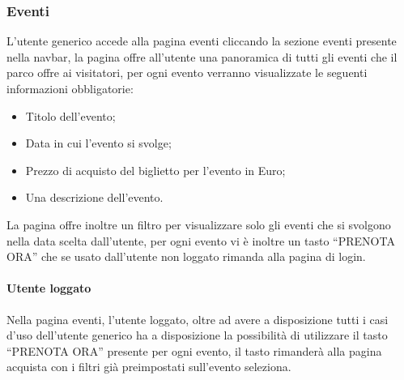         \subsubsection{Eventi}
            L’utente generico accede alla pagina eventi cliccando la sezione eventi presente nella navbar, la pagina offre all’utente una panoramica di tutti gli eventi che il parco offre ai visitatori, per ogni evento verranno visualizzate le seguenti informazioni obbligatorie:
            \begin{itemize}
                \item Titolo dell’evento;
                \item Data in cui l’evento si svolge;
                \item Prezzo di acquisto del biglietto per l’evento in Euro;
                \item Una descrizione dell’evento.
            \end{itemize}
            La pagina offre inoltre un filtro per visualizzare solo gli eventi che si svolgono nella data scelta dall’utente, per ogni evento vi è inoltre un tasto “PRENOTA ORA” che se usato dall’utente non loggato rimanda alla pagina di login.
            \paragraph{Utente loggato} Nella pagina eventi, l’utente loggato, oltre ad avere a disposizione tutti i casi d’uso dell’utente generico ha a disposizione la possibilità di utilizzare il tasto “PRENOTA ORA” presente per ogni evento, il tasto rimanderà alla pagina acquista con i filtri già preimpostati sull’evento seleziona.

